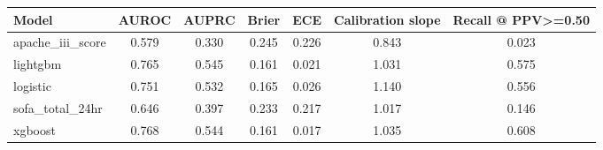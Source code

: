 \begin{tabular}{@{}lcccccc@{}}
\toprule
Model & AUROC & AUPRC & Brier & ECE & Calibration slope & Recall @ PPV>=0.50\\
\midrule
apache\_iii\_score & 0.579 & 0.330 & 0.245 & 0.226 & 0.843 & 0.023\\
lightgbm & 0.765 & 0.545 & 0.161 & 0.021 & 1.031 & 0.575\\
logistic & 0.751 & 0.532 & 0.165 & 0.026 & 1.140 & 0.556\\
sofa\_total\_24hr & 0.646 & 0.397 & 0.233 & 0.217 & 1.017 & 0.146\\
xgboost & 0.768 & 0.544 & 0.161 & 0.017 & 1.035 & 0.608\\
\bottomrule
\end{tabular}

